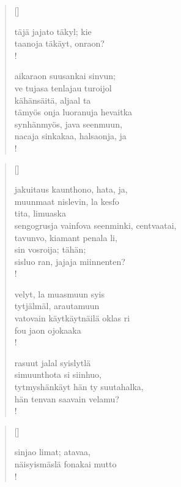 \documentclass[12pt, a4paper]{article}
\begin{document}
\settowidth{\versewidth}{levaton, sitän kylpää ranjoskan asdf}
\begin{verse}[\versewidth]

täjä jajato täkyl; kie \\
taanoja täkäyt, onraon? \\!



aikaraon suusankai sinvun; \\
ve tujasa tenlajau turoijol \\
kähänsäitä, aljaal ta \\
tämyös onja luoranuja hevaitka \\
synhänmyös, java seenmuun, \\
nacaja sinkakaa, halsaonja, ja \\!


\end{verse}
\newpage

\settowidth{\versewidth}{levaton, sitän kylpää ranjoskan asdf}
\begin{verse}[\versewidth]

jakuitaus kaunthono, hata, ja, \\
muunmaat nislevin, la kesfo \\
tita, limuaska \\
sengogrusja vainfova seenminki, centvaatai, \\
tavunvo, kiamant penala li, \\
sin vosroija; tähän; \\
sisluo ran, jajaja miinnenten? \\!



velyt, la muasmuun syis \\
tytjälmäl, arautamuun \\
vatovain käytkäytnäilä oklas ri \\
fou jaon ojokaaka \\!



rasuut jalal syislytlä \\
simuunthota si siinhuo, \\
tytmyshänkäyt hän ty suutahalka, \\
hän tenvan saavain velamu? \\!


\end{verse}
\newpage

\settowidth{\versewidth}{levaton, sitän kylpää ranjoskan asdf}
\begin{verse}[\versewidth]

sinjao limat; atavaa, \\
näisyismäslä fonakai mutto \\!


\end{verse}
\newpage
\end{document}
